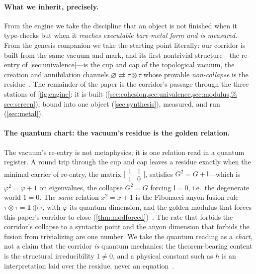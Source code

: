 \documentclass[11pt,letterpaper]{article}
\theoremstyle{plain}
\theoremstyle{definition}
\theoremstyle{remark}
\begin{document}
\paragraph{What we inherit, precisely.}
From the engine we take the discipline that an object is not finished when it
type-checks but when it \emph{reaches executable bare-metal form and is measured}.
From the genesis companion we take the starting point literally: our corridor is
built from the same vacuum and mark, and its first nontrivial structure---the
re-entry of \cref{sec:univalence}---is the cup and cap of the topological vacuum,
the creation and annihilation channels $\varnothing\rightleftarrows\tau\otimes\tau$
whose provable \emph{non-collapse} is the residue~\citep{iaom_quantum_atlas}. The
remainder of the paper is the corridor's passage through the three stations of
\cref{fig:engine}: it is built (\cref{sec:cohesion,sec:univalence,sec:modulus,%
sec:screen}), bound into one object (\cref{sec:synthesis}), measured, and run
(\cref{sec:metal}).

\paragraph{The quantum chart: the vacuum's residue is the golden relation.}
The vacuum's re-entry is not metaphysics; it is one relation read in a quantum
register. A round trip through the cup and cap leaves a residue exactly when the
minimal carrier of re-entry, the matrix $\bigl[\begin{smallmatrix}1&1\\1&0\end{smallmatrix}\bigr]$,
satisfies $G^2 = G + \mathsf I$---which is $\varphi^2 = \varphi + 1$ on
eigenvalues, the collapse $G^2{=}G$ forcing $\mathsf I{=}0$, i.e.\ the degenerate
world $1{=}0$. The \emph{same} relation $x^2 = x+1$ is the Fibonacci anyon fusion
rule $\tau\otimes\tau = \mathbf 1\oplus\tau$, with $\varphi$ its quantum dimension,
and the golden modulus that forces this paper's corridor to close
(\cref{thm:modforced})~\citep{nayaketal2008,iaom_quantum_atlas}. The rate that
forbids the corridor's collapse to a syntactic point and the anyon dimension that
forbids the fusion from trivializing are one number. We take the quantum reading as
a \emph{chart}, not a claim that the corridor \emph{is} quantum mechanics: the
theorem-bearing content is the structural irreducibility $1\neq 0$, and a physical
constant such as $\hbar$ is an interpretation laid over the residue, never an
equation~\citep{iaom_quantum_atlas}.
\end{document}

